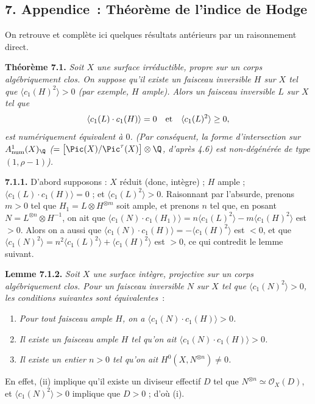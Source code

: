 \subsection*{7. Appendice~: Th\'eor\`eme de l'indice de Hodge}

On retrouve et compl\`ete ici quelques r\'esultats ant\'erieurs par un raisonnement direct.

\textbf{Th\'eor\`eme 7.1.} \emph{Soit $X$ une surface irr\'eductible, propre sur un corps alg\'ebriquement clos. On suppose qu'il existe un faisceau inversible $H$ sur $X$ tel que $\langle c_1(H)^2\rangle>0$ (par exemple, $H$ ample). Alors un faisceau inversible $L$ sur $X$ tel que}
\[
   \langle c_1(L)\cdot c_1(H)\rangle=0
   \quad\hbox{et}\quad
   \langle c_1(L)^2\rangle\geq 0,
\]
\emph{est num\'eriquement \'equivalent \`a $0$. (Par cons\'equent, la forme d'intersection sur $A^1_{\mathrm{num}}(X)_{\Q}$ ($=\bigl[\Pic(X)/\Pic^\tau(X)\bigr]\otimes\Q$, d'apr\`es 4.6) est non-d\'eg\'en\'er\'ee de type $(1,\rho-1)$).}

\textbf{7.1.1.} D'abord supposons : $X$ r\'eduit (donc, int\`egre) ; $H$ ample ; $\langle c_1(L)\cdot c_1(H)\rangle=0$ ; et $\langle c_1(L)^2\rangle>0$. Raisonnant par l'absurde, prenons $m>0$ tel que $H_1=L\otimes H^{\otimes m}$ soit ample, et prenons $n$ tel que, en posant $N=L^{\otimes n}\otimes H^{-1}$, on ait que $\langle c_1(N)\cdot c_1(H_1)\rangle=n\langle c_1(L)^2\rangle-m\langle c_1(H)^2\rangle$ est $>0$. Alors on a aussi que $\langle c_1(N)\cdot c_1(H)\rangle=-\langle c_1(H)^2\rangle$ est $<0$, et que $\langle c_1(N)^2\rangle=n^2\langle c_1(L)^2\rangle+\langle c_1(H)^2\rangle$ est $>0$, ce qui contredit le lemme suivant.

\textbf{Lemme 7.1.2.} \emph{Soit $X$ une surface int\`egre, projective sur un corps alg\'ebriquement clos. Pour un faisceau inversible $N$ sur $X$ tel que $\langle c_1(N)^2\rangle>0$, les conditions suivantes sont \'equivalentes}~:
\begin{enumerate}[label=(\roman*)]
\item \emph{Pour tout faisceau ample $H$, on a $\langle c_1(N)\cdot c_1(H)\rangle>0$.}
\item[(i')] \emph{Il existe un faisceau ample $H$ tel qu'on ait $\langle c_1(N)\cdot c_1(H)\rangle>0$.}
\item \emph{Il existe un entier $n>0$ tel qu'on ait $H^0(X,N^{\otimes n})\ne0$.}
\end{enumerate}
En
effet, (ii) implique qu'il existe un diviseur effectif $D$ tel que $N^{\otimes n}\simeq\mathcal O_X(D)$, et $\langle c_1(N)^2\rangle>0$ implique que $D>0$ ; d'o\`u (i).

